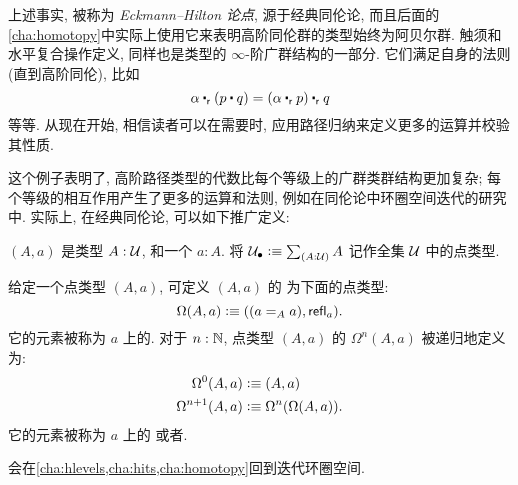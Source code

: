 上述事实, 被称为 \emph{Eckmann–Hilton 论点}, 源于经典同伦论, 而且后面的\cref{cha:homotopy}中实际上使用它来表明高阶同伦群的类型始终为阿贝尔群.
触须和水平复合操作定义, 同样也是类型的 $\infty$-阶广群结构的一部分.
它们满足自身的法则(直到高阶同伦), 比如
\[
    \alpha \rightwhisker (p\ct q) = (\alpha \rightwhisker p) \rightwhisker q
\]
等等.
从现在开始, 相信读者可以在需要时, 应用路径归纳来定义更多的运算并校验其性质.

这个例子表明了, 高阶路径类型的代数比每个等级上的广群类群结构更加复杂;
每个等级的相互作用产生了更多的运算和法则, 例如在同伦论中环圈空间迭代的研究中.
实际上, 在经典同伦论, 可以如下推广定义:

\begin{defn}
    \label{def:pointedtype}
    $(A,a)$ 是类型 $A:\type$, 和一个 $a:A$.
    将 $\pointed{\type} \defeq \sm{A:\type} A$ 记作全集 $\type$ 中的点类型.
\end{defn}

\begin{defn}
    \label{def:loopspace}
    给定一个点类型 $(A,a)$, 可定义 $(A,a)$ 的%
    为下面的点类型:
    \[\Omega(A,a)\defeq ((\id[A]aa),\refl a).\]
    它的元素被称为 $a$ 上的.
    对于 $n:\N$, 点类型 $(A,a)$ 的  $\Omega^{n}(A,a)$
    被递归地定义为:
    \begin{align*}
        \Omega^0(A,a)&\defeq(A,a)\\
        \Omega^{n+1}(A,a)&\defeq\Omega^n(\Omega(A,a)).
    \end{align*}
    它的元素被称为 $a$ 上的
    或者.

\end{defn}

会在\cref{cha:hlevels,cha:hits,cha:homotopy}回到迭代环圈空间.
%
%